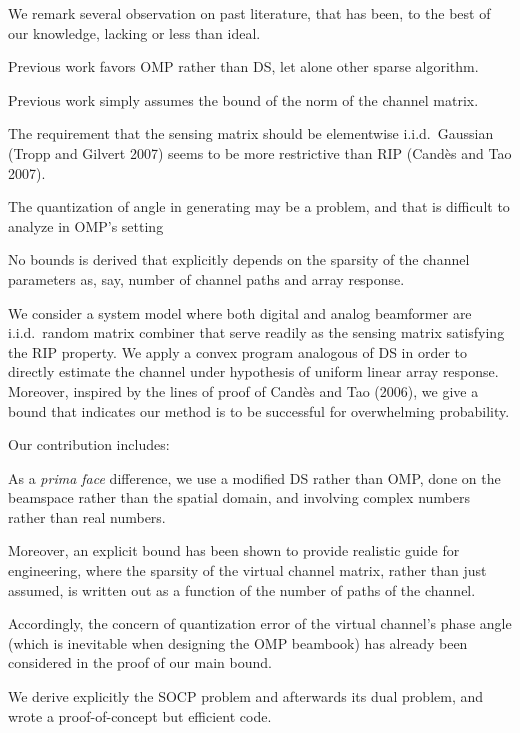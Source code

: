 We remark several observation on past literature, that has been, to the best of our knowledge, lacking or less than ideal.

\startitemize
\item Previous work favors OMP rather than DS, let alone other sparse algorithm.
\item Previous work simply assumes the bound of the norm of the channel matrix.
\item The requirement that the sensing matrix should be elementwise i.i.d.\ Gaussian (Tropp and Gilvert 2007) seems to be more restrictive than RIP (Cand\`es and Tao 2007).
\item The quantization of angle in generating may be a problem, and that is difficult to analyze in OMP's setting
\item No bounds is derived that explicitly depends on the sparsity of the channel parameters as, say, number of channel paths and array response.
\stopitemize

\startsection [title={Our Contribution}]

We consider a system model where both digital and analog beamformer are i.i.d.\ random matrix combiner that serve readily as the sensing matrix satisfying the RIP property.
We apply a convex program analogous of DS in order to directly estimate the channel under hypothesis of uniform linear array response.
Moreover, inspired by the lines of proof of Cand\`es and Tao (2006), we give a bound that indicates our method is to be successful for overwhelming probability.

Our contribution includes:

\startitemize
\item As a {\it prima face} difference, we use a modified DS rather than OMP, done on the beamspace rather than the spatial domain, and involving complex numbers rather than real numbers.
\item Moreover, an explicit bound has been shown to provide realistic guide for engineering, where the sparsity of the virtual channel matrix, rather than just assumed, is written out as a function of the number of paths of the channel.
\item Accordingly, the concern of quantization error of the virtual channel's phase angle (which is inevitable when designing the OMP beambook) has already been considered in the proof of our main bound.
\item We derive explicitly the SOCP problem and afterwards its dual problem, and wrote a proof-of-concept but efficient code.
\stopitemize

\stopsection

\stopchapter

